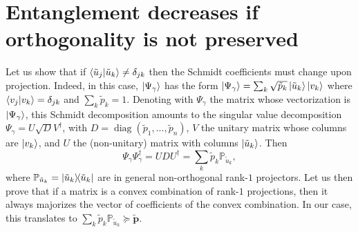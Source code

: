 \documentclass[
	aps, pra,
	superscriptaddress, twocolumn,
	floatfix,
	10pt
]{revtex4-1}
\newcommand{\bs}[1]{\boldsymbol{#1}}
\newcommand{\on}[1]{\operatorname{#1}}
\newcommand{\PP}{\mathbb{P}}
\begin{document}
\section{Entanglement decreases if orthogonality is not preserved}
\label{proof1}
Let us show that if $\braket{\tilde u_j}{\tilde u_k}\neq\delta_{jk}$ then the Schmidt coefficients must change upon projection.
Indeed, in this case, $\ket{\Psi_\gamma}$ has the form
$\ket{\Psi_\gamma}=\sum_k \sqrt{\tilde p_k} \ket{\tilde u_k}\ket{v_k}$ where $\braket{v_j}{v_k}=\delta_{jk}$ and $\sum_k \tilde p_k=1$.
Denoting with $\Psi_\gamma$ the matrix whose vectorization is $\ket{\Psi_\gamma}$, this Schmidt decomposition amounts to the singular value decomposition $\Psi_\gamma = U\sqrt DV^\dagger$, with $D=\on{diag}(\tilde p_1,...,\tilde p_n)$, $V$ the unitary matrix whose columns are $\ket{v_k}$, and $U$  the (non-unitary) matrix with columns $\ket{\tilde u_k}$.
Then
\begin{equation}
    \Psi_\gamma\Psi_\gamma^\dagger = U D U^\dagger
    = \sum_k \tilde p_k \PP_{\tilde u_k},
\end{equation}
where $\PP_{\tilde u_k}=\ketbra{\tilde u_k}$ are in general non-orthogonal rank-$1$ projectors.
Let us then prove that if a matrix is a convex combination of rank-$1$ projections, then it always majorizes the vector of coefficients of the convex combination.
In our case, this translates to $\sum_k \tilde p_k\PP_{\tilde u_k}\succeq \tilde{\bs{p}}$.
\end{document}
